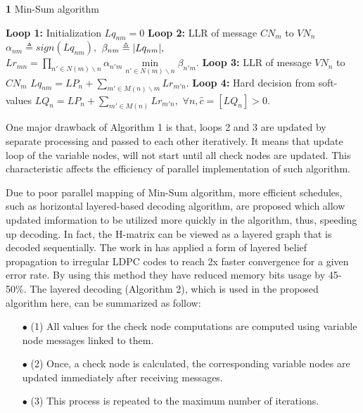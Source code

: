 \documentclass[conference]{IEEEtran}
\DeclarePairedDelimiter\abs{\lvert}{\rvert}%
\begin{document}
\begin{algorithm}
\renewcommand\thealgorithm{}
\caption{\textbf{1} Min-Sum algorithm}\label{algorithm1}
\begin{algorithmic}[1]
\STATE \textbf{Loop 1:} Initialization
\STATE
$Lq_{nm}=0$%
\ENDFOR
{}
\STATE \textbf{Loop 2:} LLR of message $CN_m$ to $VN_n$
\STATE $\alpha_{nm} \triangleq sign(Lq_{nm}),$
\STATE $\beta_{nm} \triangleq \abs{Lq_{nm}},$
\STATE $Lr_{mn} = \prod\limits_{n' \in N(m)\backslash n} \alpha_{n'm} \min\limits_{n' \in N(m)\backslash n} \beta_{n'm}.$
\ENDFOR
\STATE \textbf{Loop 3:} LLR of message $VN_n$ to $CN_m$
\STATE $Lq_{nm} = LP_n + \sum\limits_{m' \in M(n)\backslash m} Lr_{m'n}.$
\ENDFOR  
\ENDFOR %
\STATE \textbf{Loop 4:} Hard decision from soft-values
\STATE $LQ_{n} = LP_n + \sum\limits_{m' \in M(n)} Lr_{m'n},$
\STATE $\forall n, \hat{c}=[LQ_n]>0.$
\ENDFOR
\end{algorithmic}
\addtocounter{algorithm}{-1}
\end{algorithm}

One major drawback of Algorithm 1 is that, loops 2 and 3 are updated by separate processing and passed to each other iteratively. It means that update loop of the variable nodes, will not start until all check nodes are updated. This characteristic affects the efficiency of parallel implementation of such algorithm. 

Due to poor parallel mapping of Min-Sum algorithm, more efficient schedules, such as horizontal layered-based decoding algorithm, are proposed which allow updated imformation to be utilized more quickly in the algorithm, thus, speeding up decoding\cite{art_layered0, art_layered1}. In fact, the H-matrix can be viewed as a layered graph that is decoded sequentially. The work in \cite{art_gpu_0} has applied a form of layered belief propagation to irregular LDPC codes to reach 2x faster convergence for a given error rate. By using this method they have reduced memory bits usage by 45-50\%. The layered decoding (Algorithm 2), which is used in the proposed algorithm here, can be summarized as follow:
\begin{enumerate}
\item[$\bullet$] (1) All values for the check node computations are computed using variable node messages linked to them.
\item[$\bullet$] (2) Once, a check node is calculated, the corresponding variable nodes are updated immediately after receiving messages.
\item[$\bullet$] (3) This process is repeated to the maximum number of iterations.
\end{enumerate}
\end{document}

